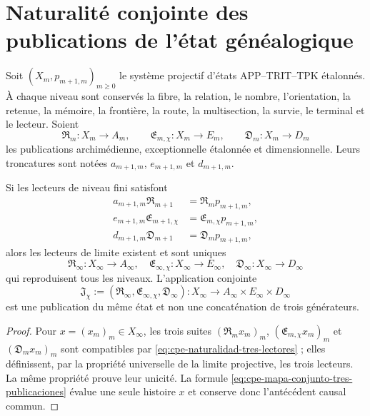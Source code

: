 \section{Naturalité conjointe des publications de l'état généalogique}
\label{sec:cpe-naturalidad-tres-publicaciones}

Soit \((X_m,p_{m+1,m})_{m\ge0}\) le système projectif d'états
APP--TRIT--TPK étalonnés. À chaque niveau sont conservés la fibre, la relation,
le nombre, l'orientation, la retenue, la mémoire, la frontière, la route, la multisection,
la survie, le terminal et le lecteur. Soient
\[
 \mathfrak R_m:X_m\to A_m,
 \qquad
 \mathfrak E_{m,\chi}:X_m\to E_m,
 \qquad
 \mathfrak D_m:X_m\to D_m
\]
les publications archimédienne, exceptionnelle étalonnée et dimensionnelle. Leurs
troncatures sont notées \(a_{m+1,m}\), \(e_{m+1,m}\) et
\(d_{m+1,m}\).

\begin{theorem}
\label{thm:cpe-cono-tres-publicaciones}
Si les lecteurs de niveau fini satisfont
\begin{equation}
\begin{aligned}
 a_{m+1,m}\mathfrak R_{m+1}&=\mathfrak R_mp_{m+1,m},\\
 e_{m+1,m}\mathfrak E_{m+1,\chi}&=\mathfrak E_{m,\chi}p_{m+1,m},\\
 d_{m+1,m}\mathfrak D_{m+1}&=\mathfrak D_mp_{m+1,m},
\end{aligned}
\label{eq:cpe-naturalidad-tres-lectores}
\end{equation}
alors les lecteurs de limite existent et sont uniques
\[
 \mathfrak R_\infty:X_\infty\to A_\infty,
 \quad
 \mathfrak E_{\infty,\chi}:X_\infty\to E_\infty,
 \quad
 \mathfrak D_\infty:X_\infty\to D_\infty
\]
qui reproduisent tous les niveaux. L'application conjointe
\begin{equation}
 \mathfrak J_\chi
 :=(\mathfrak R_\infty,\mathfrak E_{\infty,\chi},\mathfrak D_\infty)
 :X_\infty\longrightarrow A_\infty\times E_\infty\times D_\infty
 \label{eq:cpe-mapa-conjunto-tres-publicaciones}
\end{equation}
est une publication du même état et non une concaténation de trois
générateurs.
\end{theorem}

\begin{proof}
Pour \(x=(x_m)_m\in X_\infty\), les trois suites
\((\mathfrak R_mx_m)_m\), \((\mathfrak E_{m,\chi}x_m)_m\) et
\((\mathfrak D_mx_m)_m\) sont compatibles par
\eqref{eq:cpe-naturalidad-tres-lectores} ; elles définissent, par la propriété universelle
de la limite projective, les trois lecteurs. La même propriété prouve leur unicité.
La formule \eqref{eq:cpe-mapa-conjunto-tres-publicaciones} évalue une seule
histoire \(x\) et conserve donc l'antécédent causal commun.
\end{proof}


